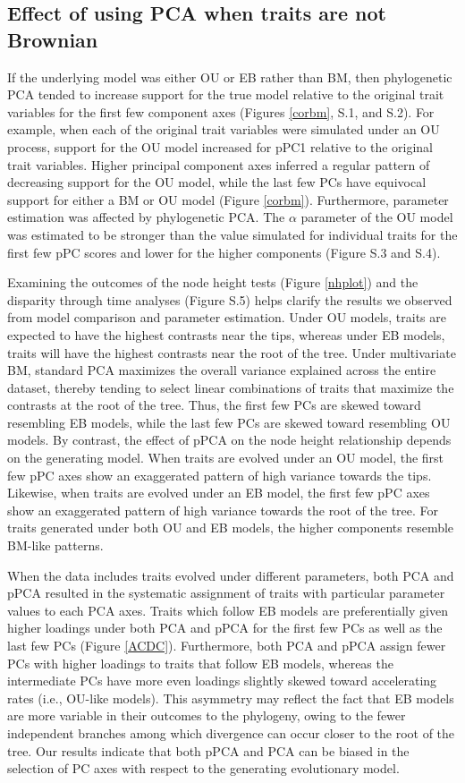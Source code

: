 \documentclass[a4paper,11pt]{article}
\begin{document}
\subsection{Effect of using PCA when traits are not Brownian}
If the underlying model was either OU or EB rather than BM, then phylogenetic PCA tended to increase support for the true model relative to the original trait variables for the first few component axes (Figures \ref{corbm}, S.1, and S.2). For example, when each of the original trait variables were simulated under an OU process, support for the OU model increased for pPC1 relative to the original trait variables. Higher principal component axes inferred a regular pattern of decreasing support for the OU model, while the last few PCs have equivocal support for either a BM or OU model (Figure \ref{corbm}). Furthermore, parameter estimation was affected by phylogenetic PCA. The $\alpha$ parameter of the OU model was estimated to be stronger than the value simulated for individual traits for the first few pPC scores and lower for the higher components (Figure S.3 and S.4). 

Examining the outcomes of the node height tests (Figure \ref{nhplot}) and the disparity through time analyses (Figure S.5) helps clarify the results we observed from model comparison and parameter estimation. Under OU models, traits are expected to have the highest contrasts near the tips, whereas under EB models, traits will have the highest contrasts near the root of the tree. Under multivariate BM, standard PCA maximizes the overall variance explained across the entire dataset, thereby tending to select linear combinations of traits that maximize the contrasts at the root of the tree. Thus, the first few PCs are skewed toward resembling EB models, while the last few PCs are skewed toward resembling OU models. By contrast, the effect of pPCA on the node height relationship depends on the generating model. When traits are evolved under an OU model, the first few pPC axes show an exaggerated pattern of high variance towards the tips. Likewise, when traits are evolved under an EB model, the first few pPC axes show an exaggerated pattern of high variance towards the root of the tree. For traits generated under both OU and EB models, the higher components resemble BM-like patterns. 

When the data includes traits evolved under different parameters, both PCA and pPCA resulted in the systematic assignment of traits with particular parameter values to each PCA axes. Traits which follow EB models are preferentially given higher loadings under both PCA and pPCA for the first few PCs as well as the last few PCs (Figure \ref{ACDC}). Furthermore, both PCA and pPCA assign fewer PCs with higher loadings to traits that follow EB models, whereas the intermediate PCs have more even loadings slightly skewed toward accelerating rates (i.e., OU-like models). This asymmetry may reflect the fact that EB models are more variable in their outcomes to the phylogeny, owing to the fewer independent branches among which divergence can occur closer to the root of the tree. Our results indicate that both pPCA and PCA can be biased in the selection of PC axes with respect to the generating evolutionary model.
\end{document}
